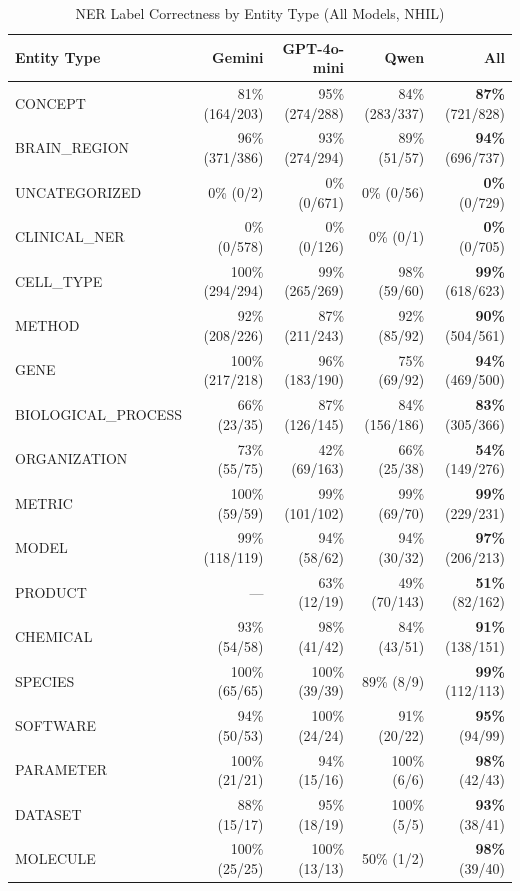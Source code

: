 \begin{table}[ht]
\centering
\caption{NER Label Correctness by Entity Type (All Models, NHIL)}
\label{tab:ner-per-label}
\begin{tabular}{lrrrr}
\toprule
\textbf{Entity Type} & \textbf{Gemini} & \textbf{GPT-4o-mini} & \textbf{Qwen} & \textbf{All} \\
\midrule
CONCEPT & 81\% (164/203) & 95\% (274/288) & 84\% (283/337) & \textbf{87\%} (721/828) \\
BRAIN\_REGION & 96\% (371/386) & 93\% (274/294) & 89\% (51/57) & \textbf{94\%} (696/737) \\
UNCATEGORIZED & 0\% (0/2) & 0\% (0/671) & 0\% (0/56) & \textbf{0\%} (0/729) \\
CLINICAL\_NER & 0\% (0/578) & 0\% (0/126) & 0\% (0/1) & \textbf{0\%} (0/705) \\
CELL\_TYPE & 100\% (294/294) & 99\% (265/269) & 98\% (59/60) & \textbf{99\%} (618/623) \\
METHOD & 92\% (208/226) & 87\% (211/243) & 92\% (85/92) & \textbf{90\%} (504/561) \\
GENE & 100\% (217/218) & 96\% (183/190) & 75\% (69/92) & \textbf{94\%} (469/500) \\
BIOLOGICAL\_PROCESS & 66\% (23/35) & 87\% (126/145) & 84\% (156/186) & \textbf{83\%} (305/366) \\
ORGANIZATION & 73\% (55/75) & 42\% (69/163) & 66\% (25/38) & \textbf{54\%} (149/276) \\
METRIC & 100\% (59/59) & 99\% (101/102) & 99\% (69/70) & \textbf{99\%} (229/231) \\
MODEL & 99\% (118/119) & 94\% (58/62) & 94\% (30/32) & \textbf{97\%} (206/213) \\
PRODUCT & --- & 63\% (12/19) & 49\% (70/143) & \textbf{51\%} (82/162) \\
CHEMICAL & 93\% (54/58) & 98\% (41/42) & 84\% (43/51) & \textbf{91\%} (138/151) \\
SPECIES & 100\% (65/65) & 100\% (39/39) & 89\% (8/9) & \textbf{99\%} (112/113) \\
SOFTWARE & 94\% (50/53) & 100\% (24/24) & 91\% (20/22) & \textbf{95\%} (94/99) \\
PARAMETER & 100\% (21/21) & 94\% (15/16) & 100\% (6/6) & \textbf{98\%} (42/43) \\
DATASET & 88\% (15/17) & 95\% (18/19) & 100\% (5/5) & \textbf{93\%} (38/41) \\
MOLECULE & 100\% (25/25) & 100\% (13/13) & 50\% (1/2) & \textbf{98\%} (39/40) \\

\end{tabular}
\end{table}
